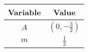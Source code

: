 \begin{tabular}{|c|c|}
\hline
\textbf{Variable} & \textbf{Value} \\
\hline
$A$ & $(0,-\frac{3}{2})$ \\
\hline
$m$ & $\frac{1}{2}$ \\
\hline
\end{tabular}